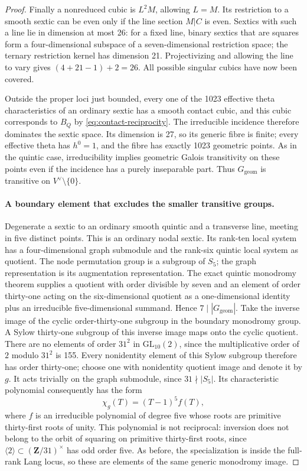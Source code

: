 \begin{proof}
Finally a nonreduced cubic is $L^2M$, allowing $L=M$.
Its restriction to a smooth sextic can be even only if the line
section $M|C$ is even.  Sextics with such a line lie in dimension at
most 26: for a fixed line, binary sextics that are squares form a
four-dimensional subspace of a seven-dimensional restriction space;
the ternary restriction kernel has dimension 21.  Projectivizing and
allowing the line to vary gives $(4+21-1)+2=26$.
All possible singular cubics have now been covered.

Outside the proper loci just bounded, every one of the 1023 effective
theta characteristics of an ordinary sextic has a smooth contact
cubic, and this cubic corresponds to $B_Q$ by
\eqref{eq:contact-reciprocity}.  The irreducible incidence therefore
dominates the sextic space.  Its dimension is 27, so its generic
fibre is finite; every effective theta has $h^0=1$, and the fibre has
exactly 1023 geometric points.  As in the quintic case, irreducibility
implies geometric Galois transitivity on these points even if the
incidence has a purely inseparable part.  Thus $G_{\mathrm{geom}}$
is transitive on $V^\vee\setminus\{0\}$.

\paragraph{A boundary element that excludes the smaller transitive groups.}
Degenerate a sextic to an ordinary smooth quintic and a transverse
line, meeting in five distinct points.  This is an ordinary nodal
sextic.  Its rank-ten local system has a four-dimensional graph
submodule and the rank-six quintic local system as quotient.
The node permutation group is a subgroup of $S_5$; the graph
representation is its augmentation representation.
The exact quintic monodromy theorem supplies a quotient with order
divisible by seven and an element of order thirty-one acting on the
six-dimensional quotient as a one-dimensional identity plus an
irreducible five-dimensional summand.  Hence $7\mid|G_{\mathrm{geom}}|$.
Take the inverse image of the cyclic order-thirty-one subgroup in
the boundary monodromy group.  A Sylow thirty-one subgroup of this
inverse image maps onto the cyclic quotient.  There are no elements
of order $31^2$ in $\mathrm{GL}_{10}(2)$, since the multiplicative
order of $2$ modulo $31^2$ is 155.  Every nonidentity element of this
Sylow subgroup therefore has order thirty-one; choose one with
nonidentity quotient image and denote it by $g$.
It acts trivially on the graph submodule, since $31\nmid|S_5|$.
Its characteristic polynomial consequently has the form
\begin{equation}\label{eq:sextic-order31}
 \chi_g(T)=(T-1)^5 f(T),
\end{equation}
where $f$ is an irreducible polynomial of degree five whose roots
are primitive thirty-first roots of unity.
This polynomial is not reciprocal: inversion does not belong to
the orbit of squaring on primitive thirty-first roots, since
$\langle2\rangle\subset(\mathbf Z/31)^\times$ has odd order five.
As before, the specialization is inside the full-rank Lang locus,
so these are elements of the same generic monodromy image.


\end{proof}
